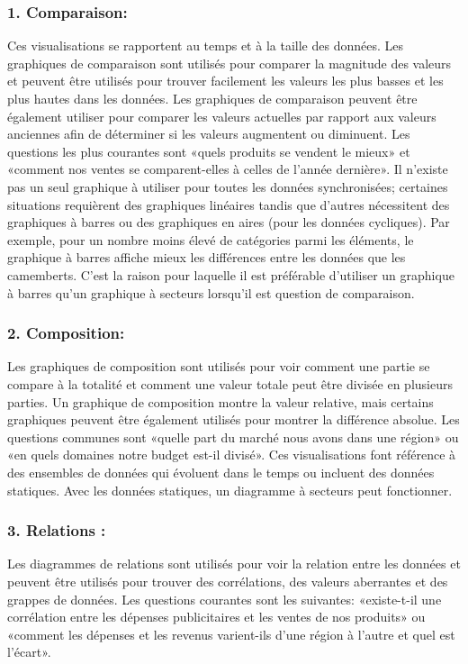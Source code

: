 \documentclass[french, a4paper, 12pt]{report}
\begin{document}
\subsubsection{1. Comparaison: }
Ces visualisations se rapportent au temps et à la taille des données. Les graphiques de comparaison sont utilisés pour comparer la magnitude des valeurs et peuvent être utilisés pour trouver facilement les valeurs les plus basses et les plus hautes dans les données. Les graphiques de comparaison peuvent être également utiliser pour comparer les valeurs actuelles par rapport aux valeurs anciennes afin de déterminer si les valeurs augmentent ou diminuent. Les questions les plus courantes sont «quels produits se vendent le mieux» et «comment nos ventes se comparent-elles à celles de l'année dernière».
Il n’existe pas un seul graphique à utiliser pour toutes les données synchronisées; certaines situations requièrent des graphiques linéaires tandis que d'autres nécessitent des graphiques à barres ou des graphiques en aires (pour les données cycliques).
Par exemple, pour un nombre moins élevé de catégories parmi les éléments, le  graphique à barres affiche mieux les différences entre les données que les camemberts. C’est la raison pour laquelle il est préférable d’utiliser un graphique à barres qu’un graphique à secteurs lorsqu'il est question de comparaison.
\subsubsection{2. Composition:}
Les graphiques de composition sont utilisés pour voir comment une partie se compare à la totalité et comment une valeur totale peut être divisée en plusieurs parties. Un graphique de composition montre la valeur relative, mais certains graphiques peuvent être également utilisés pour montrer la différence absolue. Les questions communes sont «quelle part du marché nous avons dans une région» ou «en quels domaines notre budget est-il divisé».
Ces visualisations font référence à des ensembles de données qui évoluent dans le temps ou incluent des données statiques. Avec les données statiques, un diagramme à secteurs peut fonctionner.
\subsubsection{3. Relations : }
Les diagrammes de relations sont utilisés pour voir la relation entre les données et peuvent être utilisés pour trouver des corrélations, des valeurs aberrantes et des grappes de données. Les questions courantes sont les suivantes: «existe-t-il une corrélation entre les dépenses publicitaires et les ventes de nos produits» ou «comment les dépenses et les revenus varient-ils d’une région à l’autre et quel est l’écart». 
\end{document}
